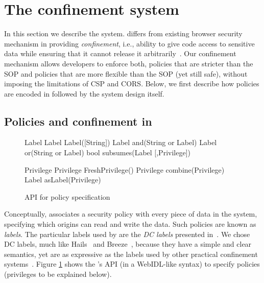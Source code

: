

\section{The \sys{} confinement system}
\label{sec:system}

In this section we describe the \sys{} system.
%
\sys{} differs from existing browser security mechanism in providing
\emph{confinement}, i.e., ability to give code access to sensitive
data while ensuring that it cannot release it
arbitrarily~\cite{SaltzerS75}.
%
Our confinement mechanism allows developers to enforce both, policies
that are stricter than the SOP and policies that are more flexible
than the SOP (yet still safe), without imposing the limitations of CSP
and CORS.
%
Below, we first describe how policies are encoded in \sys{}
followed by the system design itself.

\subsection{Policies and confinement in \sys{}}
\label{sec:system:policy}

\begin{figure}
{\small{
\begin{webidl}
Label {
  Label Label([String])
  Label and(String or Label)
  Label or(String or Label)
  bool subsumes(Label [,Privilege])
}
\end{webidl}
\begin{webidl}
Privilege {
  Privilege FreshPrivilege()
  Privilege combine(Privilege)
  Label asLabel(Privilege)
}
\end{webidl}
}}
\caption{\label{fig:APIspec} API for policy specification}
\end{figure}


Conceptually, \sys{} associates a security policy with every piece of
data in the system, specifying which origins can read and write the
data.
%
Such policies are known as \emph{labels}.
%
The particular labels used by \sys{} are the \emph{DC
labels} presented in~\cite{stefan:2011:dclabels}.
%
We chose DC labels, much like Hails~\cite{giffin:2012:hails} and
Breeze~\cite{Breeze13}, because they have a simple and clear semantics, yet are
as expressive as the labels used by other practical confinement
systems~\cite{GenLabels}. Figure \ref{fig:APIspec} shows the \sys{}'s API (in a
WebIDL-like syntax) to specify policies (privileges to be
explained below).


